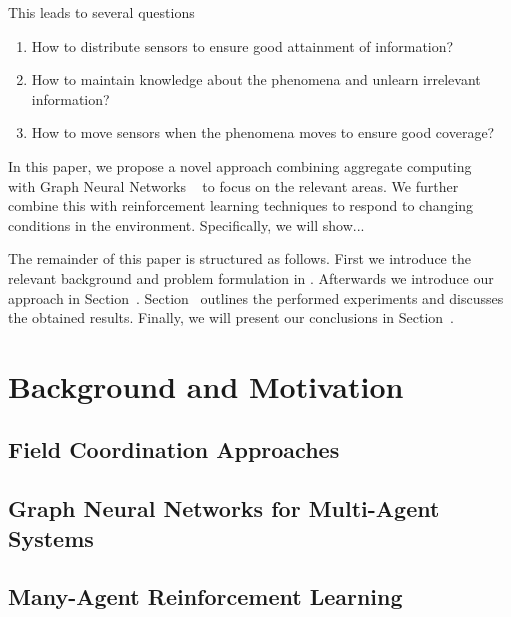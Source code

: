 \documentclass[conference]{IEEEtran}
\begin{document}
This leads to several questions 
\begin{enumerate}
	\item How to distribute sensors to ensure good attainment of information?
	\item How to maintain knowledge about the phenomena and unlearn irrelevant information?
	\item How to move sensors when the phenomena moves to ensure good coverage?
\end{enumerate} 

In this paper, we propose a novel approach combining aggregate computing
~\cite{Beal2015Computer} with Graph Neural Networks
~\cite{Zhou2020AIOpen} to focus on the relevant areas. We further combine this with reinforcement learning techniques to respond to changing conditions in the environment.
Specifically, we will show... 

The remainder of this paper is structured as follows. First we introduce the relevant background and problem formulation in . Afterwards we introduce our approach in Section~. Section~ outlines the performed experiments and discusses the obtained results. Finally, we will present our conclusions in Section~.


\section{Background and Motivation}
\label{sec:background}
\subsection{Field Coordination Approaches}
\subsection{Graph Neural Networks for Multi-Agent Systems}
\subsection{Many-Agent Reinforcement Learning}
\end{document}
